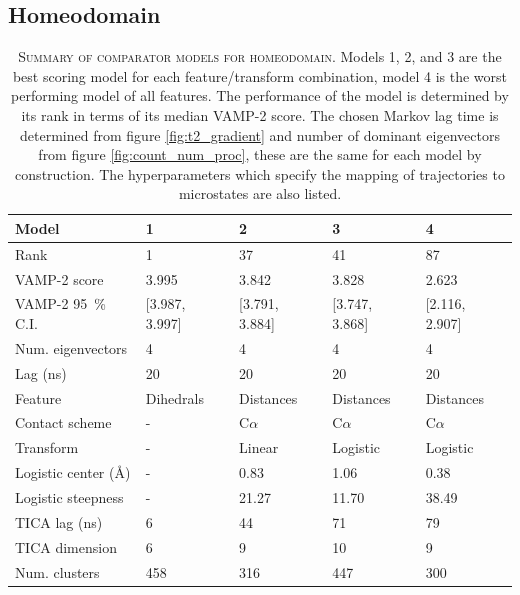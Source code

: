 \documentclass{article}
\begin{document}
\clearpage
\subsection{Homeodomain}

\begin{table}[h]
    \centering
    \begin{tabular}{lllll}
    \toprule
    Model &               1 &               2 &               3 &               4 \\
    \midrule
    Rank                             &               1 &              37 &              41 &              87 \\
    VAMP-2 score                     &           3.995 &           3.842 &           3.828 &           2.623 \\
    VAMP-2 \SI{95}{\percent} C.I.    &  [3.987, 3.997] &  [3.791, 3.884] &  [3.747, 3.868] &  [2.116, 2.907] \\
    Num. eigenvectors                &               4 &               4 &               4 &               4 \\
    Lag (ns)                         &              20 &              20 &              20 &              20 \\
    Feature                          &       Dihedrals &       Distances &       Distances &       Distances \\
    Contact scheme                   &               - &       C$\alpha$ &       C$\alpha$ &       C$\alpha$ \\
    Transform                        &               - &          Linear &        Logistic &        Logistic \\
    Logistic center (\si{\angstrom}) &               - &            0.83 &            1.06 &            0.38 \\
    Logistic steepness               &               - &           21.27 &           11.70 &           38.49 \\
    TICA lag (ns)                    &               6 &              44 &              71 &              79 \\
    TICA dimension                   &               6 &               9 &              10 &               9 \\
    Num. clusters                    &             458 &             316 &             447 &             300 \\
    \bottomrule
    \end{tabular}
    \caption{\textsc{Summary of comparator models for homeodomain.} Models 1, 2, and 3 are the best scoring model for each feature/transform combination, model 4 is the worst performing model of all features.  The performance of the model is determined by its rank in terms of its median VAMP-2 score.  The chosen Markov lag time is determined from figure \ref{fig:t2_gradient} and number of dominant eigenvectors from figure \ref{fig:count_num_proc}, these are the same for each model by construction. The hyperparameters which specify the mapping of trajectories to microstates are also listed.}
    \label{tab:uvf_mod_defs}
\end{table}
\end{document}
